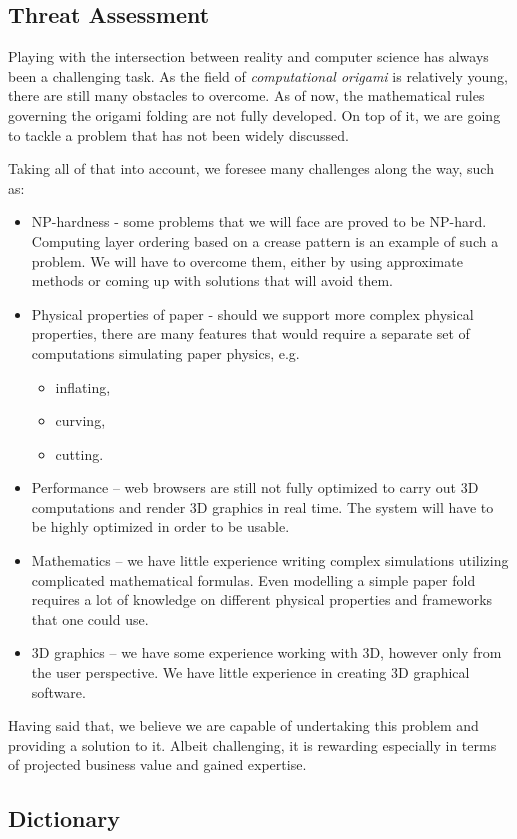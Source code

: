 \subsection{Threat Assessment}

Playing with the intersection between reality and computer science has always been a challenging task.
As the field of \textit{computational origami} is relatively young, there are still many obstacles to overcome.
As of now, the mathematical rules governing the origami folding are not fully developed.
On top of it, we are going to tackle a problem that has not been widely discussed.

Taking all of that into account, we foresee many challenges along the way, such as:

\begin{itemize}
	\item NP-hardness - some problems that we will face are proved to be NP-hard.
		Computing layer ordering based on a crease pattern is an example of such a problem.
		We will have to overcome them, either by using approximate methods or coming up with solutions that will avoid them.

	\item Physical properties of paper - should we support more complex physical properties,
		there are many features that would require a separate set of computations simulating paper physics, e.g.
		\begin{itemize}
			\item inflating,
			\item curving,
			\item cutting.
		\end{itemize}

	\item Performance -- web browsers are still not fully optimized to carry out 3D computations and render 3D graphics in real time.
		The system will have to be highly optimized in order to be usable.
		
	\item Mathematics -- we have little experience writing complex simulations utilizing complicated mathematical formulas.
		Even modelling a simple paper fold requires a lot of knowledge on different physical properties and frameworks that one could use.

	\item 3D graphics -- we have some experience working with 3D, however only from the user perspective.
		We have little experience in creating 3D graphical software.

\end{itemize}

Having said that, we believe we are capable of undertaking this problem and providing a solution to it.
Albeit challenging, it is rewarding especially in terms of projected business value and gained expertise.

\subsection{Dictionary} \label{dictionary}



